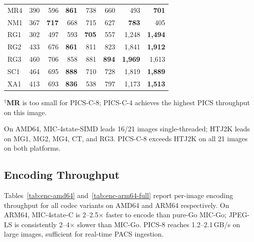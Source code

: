 \documentclass[journal]{IEEEtran}
\begin{document}
\begin{table}[t]
\begin{tabular}{lrrrrrrr}
MR4  & 390 & 596 & \textbf{861} & 738 & 660 & 493 & \textbf{701} \\
NM1  & 367 & \textbf{717} & 668 & 715 & 627 & \textbf{783} & 405 \\
RG1  & 302 & 497 & 593 & \textbf{705} & 557 & 1,248 & \textbf{1,494} \\
RG2  & 433 & 676 & \textbf{861} & 811 & 823 & 1,841 & \textbf{1,912} \\
RG3  & 460 & 706 & 858 & 881 & \textbf{894} & \textbf{1,969} & 1,613 \\
SC1  & 464 & 695 & \textbf{888} & 710 & 728 & 1,819 & \textbf{1,889} \\
XA1  & 413 & 693 & \textbf{836} & 538 & 797 & 1,173 & \textbf{1,513} \\
\bottomrule
\end{tabular}
\end{table}

$^\dagger$\textbf{MR} is too small for PICS-C-8; PICS-C-4 achieves the highest
PICS throughput on this image.

On AMD64, MIC-4state-SIMD leads 16/21 images single-threaded; HTJ2K leads on
MG1, MG2, MG4, CT, and RG3. PICS-C-8 exceeds HTJ2K on all 21 images on both
platforms.

\subsection{Encoding Throughput}

Tables~\ref{tab:enc-amd64} and~\ref{tab:enc-arm64-full} report per-image
encoding throughput for all codec variants on AMD64 and ARM64 respectively.
On ARM64, MIC-4state-C is 2--2.5$\times$ faster to encode than pure-Go
MIC-Go; JPEG-LS is consistently 2--4$\times$ slower than MIC-Go. PICS-8
reaches 1.2--2.1\,GB/s on large images, sufficient for real-time PACS
ingestion.
\end{document}
